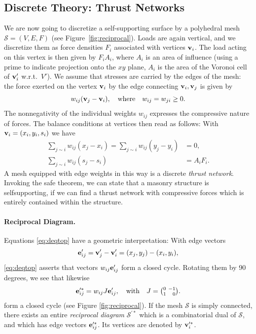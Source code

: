 \documentclass[annual]{acmsiggraph}
\def\SS{{\mathcal S}}
\begin{document}
\subsection{Discrete Theory: Thrust Networks}

We are now going to discretize a self-supporting surface by a polyhedral 
mesh $\SS=(V,E,F)$ (see Figure~\ref{fig:reciprocal}). Loads are again 
vertical, and we discretize them as force densities $F_i$ associated with 
vertices ${\mathbf v}_i$. The load acting on this vertex is then given by 
$F_iA_i$, where $A_i$ is an area of influence (using a prime to indicate 
projection onto the $xy$ plane, $A_i$ is the area of the Voronoi cell of 
${\mathbf v}_i'$ w.r.t.\ $V'$). We assume that stresses are carried by the edges 
of the mesh: the force exerted on the vertex ${\mathbf v}_i$ by the edge 
connecting ${\mathbf v}_i,{\mathbf v}_j$ is given by
	$$
	w_{ij} ({\mathbf v}_j-{\mathbf v}_i),
	\quad
	\text{where}\quad
	w_{ij}=w_{ji}\ge 0.
	$$
 The nonnegativity of the individual weights $w_{ij}$ expresses the 
compressive nature of forces. The balance conditions at vertices then read 
as follows: With ${\mathbf v}_i=(x_i,y_i,s_i)$ we have
	\begin{align}
	\sum_{j\sim i}
		w_{ij} (x_j - x_i) 
	=
	\sum_{j\sim i}
		w_{ij} (y_j - y_i) &= 0,
			 \label{eq:deqtop} \\
	\sum_{j\sim i}
		w_{ij} (s_j - s_i) 
		&= A_i F_i.
			\label{eq:deqz}
	\end{align}
 A mesh equipped with edge weights in this way is a discrete \emph{thrust 
network}. Invoking the safe theorem, we can state that a masonry structure 
is self\dash supporting, if we can find a thrust network with compressive 
forces which is entirely contained within the structure.


\paragraph{Reciprocal Diagram.}

Equations \eqref{eq:deqtop} have a geometric interpretation: With edge 
vectors
	$${\mathbf e}'_{ij} = {\mathbf v}_j'-{\mathbf v}_i'=(x_j, y_j) - (x_i, y_i),
	$$
 \eqref{eq:deqtop} asserts that vectors $w_{ij} {\mathbf e}_{ij}'$ form a closed 
cycle. Rotating them by 90 degrees, we see that likewise
	$$
	{\mathbf e}_{ij}^{\prime *} = w_{ij} J {\mathbf e}_{ij}', \quad \text{with}\quad
	J={\textstyle{0 \ -1 \choose 1 \ \hphantom{-}0}}.
	$$
 form a closed cycle (see Figure \ref{fig:reciprocal}).
If the mesh $\SS$ is simply connected, there exists 
an entire {\em reciprocal diagram} $\SS^{\prime *}$ which is a 
combinatorial dual of $\SS$, and which has edge vectors ${\mathbf e}_{ij}'^*$.
 Its vertices are denoted by ${\mathbf v}_i^{\prime *}$.
\end{document}
